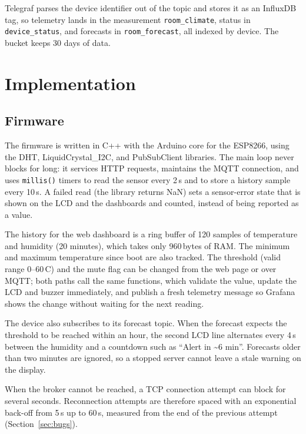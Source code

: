 \documentclass[conference]{IEEEtran}
\newcommand{\code}[1]{\texttt{\small #1}}
\begin{document}
Telegraf parses the device identifier out of the topic and stores it as an InfluxDB
tag, so telemetry lands in the measurement \code{room\_climate}, status in
\code{device\_status}, and forecasts in \code{room\_forecast}, all indexed by device. The bucket keeps 30 days of data.

\section{Implementation}

\subsection{Firmware}
The firmware is written in C++ with the Arduino core for the ESP8266, using the DHT,
LiquidCrystal\_I2C, and PubSubClient libraries. The main loop never blocks for long:
it services HTTP requests, maintains the MQTT connection, and uses \code{millis()}
timers to read the sensor every 2\,s and to store a history sample every 10\,s. A
failed read (the library returns NaN) sets a sensor-error state that is shown on the
LCD and the dashboards and counted, instead of being reported as a value.

The history for the web dashboard is a ring buffer of 120 samples of temperature and
humidity (20 minutes), which takes only 960\,bytes of RAM. The minimum and maximum
temperature since boot are also tracked. The threshold (valid range 0--60\,\textdegree C)
and the mute flag can be changed from the web page or over MQTT; both paths call the
same functions, which validate the value, update the LCD and buzzer immediately, and
publish a fresh telemetry message so Grafana shows the change without waiting for the
next reading.

The device also subscribes to its forecast topic. When the forecast expects the
threshold to be reached within an hour, the second LCD line alternates every 4\,s
between the humidity and a countdown such as ``Alert in \textasciitilde 6 min''. Forecasts older than
two minutes are ignored, so a stopped server cannot leave a stale warning on the display.

When the broker cannot be reached, a TCP connection attempt can block for several
seconds. Reconnection attempts are therefore spaced with an exponential back-off from
5\,s up to 60\,s, measured from the end of the previous attempt (Section~\ref{sec:bugs}).
\end{document}
